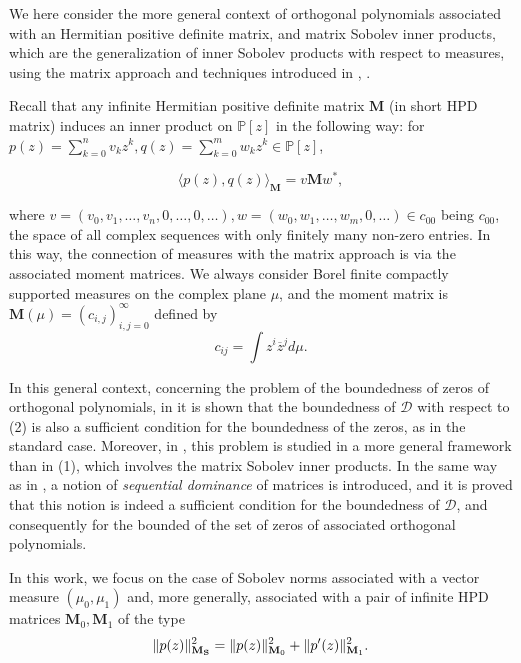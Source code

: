 \documentclass[12pt]{amsart}
\theoremstyle{definition}
\theoremstyle{plain}
\theoremstyle{remark}
\begin{document}
\bigskip  

\noindent  We here consider the more general context of orthogonal polynomials associated with an Hermitian positive definite matrix, and matrix Sobolev inner products, which are the generalization of inner Sobolev products with respect to measures, using the matrix approach and techniques introduced in \cite{EGT6}, \cite{EG23}. 

\bigskip
\noindent  Recall that any infinite Hermitian positive definite matrix $\mathbf{M}$ (in short HPD matrix) induces an inner product on $\mathbb{P}[z]$ in the following way:
for $p(z)=\sum_{k=0}^{n}v_kz^k, 
q(z)=\sum_{k=0}^{m}w_kz^k \in \mathbb{P}[z]$, 

\begin{equation}\label{aste}
    \langle p(z)
,q(z) \rangle_{\mathbf{M}}=v\mathbf{M}w^{*},
\end{equation}

\noindent where $v=(v_0,v_1,\dots,v_n,0,\dots,0,\dots), w=(w_0,w_1,\dots,w_m,0,\dots)\in c_{00}$ being $c_{00}$, the space
of all complex sequences with only finitely many non-zero entries. 
In this way, the connection of measures with the matrix approach is via the associated moment matrices. We always consider Borel finite compactly supported measures on the complex plane $\mu$, and the moment matrix is $\mathbf{M}(\mu)=(c_{i,j})_{i,j=0}^{\infty}$ defined by 
$$
c_{ij}= \int z^{i}\overline{z}^{j} d\mu .
$$ 
\bigskip






\noindent  In this general context, concerning the problem of the boundedness of zeros of orthogonal polynomials, in \cite{EGT6} it is shown that the boundedness of $\mathcal{D}$
with respect to  (2)  is also a sufficient condition for the boundedness of the zeros, as in the standard case. Moreover, 
in \cite{EG23}, this problem is studied in a more general framework than in (1), which involves the matrix Sobolev inner products. In the same way as in \cite{LP}, a notion of {\it sequential dominance} of matrices is introduced, and it is proved that this notion is indeed a sufficient condition for the boundedness of $\mathcal{D}$, and consequently for the bounded of the set of zeros of associated orthogonal polynomials. 

\noindent 

\bigskip 
\noindent In this work, we focus on the case of Sobolev norms associated with a vector measure $(\mu_0,\mu_1)$ and, more generally, associated with a pair of infinite HPD matrices $\mathbf{M}_0,\mathbf{M}_1$  of the type 
\begin{equation}{\label{dosmatrices}}
\Vert p(z)\Vert^{2}_{\mathbf{M}_{\mathbf{S}}}= \Vert p(z)\Vert^{2}_{\mathbf{M}_0}+ \Vert p'(z)\Vert^{2}_{\mathbf{M}_1}.
\end{equation}
\end{document}
